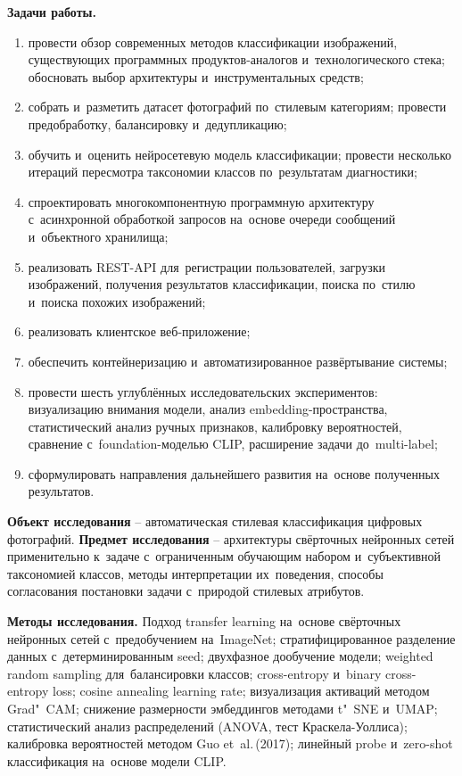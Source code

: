 \documentclass[a4paper,12pt]{diplom}
\begin{document}
\textbf{Задачи работы.}
\begin{enumerate}[label=\arabic{enumi})]
\item провести обзор современных методов классификации изображений, существующих программных продуктов-аналогов и~технологического стека; обосновать выбор архитектуры и~инструментальных средств;
\item собрать и~разметить датасет фотографий по~стилевым категориям; провести предобработку, балансировку и~дедупликацию;
\item обучить и~оценить нейросетевую модель классификации; провести несколько итераций пересмотра таксономии классов по~результатам диагностики;
\item спроектировать многокомпонентную программную архитектуру с~асинхронной обработкой запросов на~основе очереди сообщений и~объектного хранилища;
\item реализовать REST-API для~регистрации пользователей, загрузки изображений, получения результатов классификации, поиска по~стилю и~поиска похожих изображений;
\item реализовать клиентское веб-приложение;
\item обеспечить контейнеризацию и~автоматизированное развёртывание системы;
\item провести шесть углублённых исследовательских экспериментов: визуализацию внимания модели, анализ embedding-пространства, статистический анализ ручных признаков, калибровку вероятностей, сравнение с~foundation-моделью CLIP, расширение задачи до~multi-label;
\item сформулировать направления дальнейшего развития на~основе полученных результатов.
\end{enumerate}

\textbf{Объект исследования} -- автоматическая стилевая классификация цифровых фотографий. \textbf{Предмет исследования} -- архитектуры свёрточных нейронных сетей применительно к~задаче с~ограниченным обучающим набором и~субъективной таксономией классов, методы интерпретации их~поведения, способы согласования постановки задачи с~природой стилевых атрибутов.

\textbf{Методы исследования.} Подход transfer learning на~основе свёрточных нейронных сетей с~предобучением на~ImageNet; стратифицированное разделение данных с~детерминированным seed; двухфазное дообучение модели; weighted random sampling для~балансировки классов; cross-entropy и~binary cross-entropy loss; cosine annealing learning rate; визуализация активаций методом Grad"~CAM; снижение размерности эмбеддингов методами t"~SNE и~UMAP; статистический анализ распределений (ANOVA, тест Краскела-Уоллиса); калибровка вероятностей методом Guo et~al.\,(2017); линейный probe и~zero-shot классификация на~основе модели CLIP.
\end{document}
